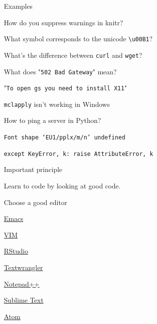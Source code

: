 \documentclass[12pt,t]{beamer}
\begin{document}
\begin{frame}{Examples}

\vspace{24pt}

\bi
\item How do you suppress warnings in knitr?
\item What symbol corresponds to the unicode {\tt {\textbackslash}u00B1}?
\item What's the difference between {\tt curl} and {\tt wget}?
\item What does "{\tt 502 Bad Gateway}" mean?
\item "{\tt To open gs you need to install X11}"
\item {\tt mclapply} isn't working in Windows
\item How to ping a server in Python?
\item {\tt Font shape `EU1/pplx/m/n' undefined}
\item {\tt except KeyError, k: raise AttributeError, k}
\ei

\end{frame}


\begin{frame}[c]{Important principle}

\centerline{Learn to code by looking at good code.}

\end{frame}



\begin{frame}{Choose a good editor}

\vspace{24pt}

\bi
\itemsep12pt
\item \href{http://www.emacswiki.org/emacs/}{Emacs}
\item \href{http://www.vim.org/}{VIM}
\item \href{http://www.rstudio.com/ide/}{RStudio}
\item \href{http://www.barebones.com/products/textwrangler/}{Textwrangler}
\item \href{http://notepad-plus-plus.org/}{Notepad++}
\item \href{http://www.sublimetext.com/}{Sublime Text}
\item \href{https://atom.io/}{Atom}
\ei

\end{frame}
\end{document}
